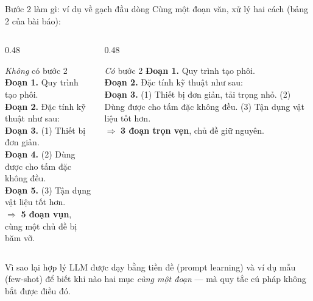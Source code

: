 \documentclass[aspectratio=169,10pt]{beamer}
\begin{document}
\begin{frame}{Bước 2 làm gì: ví dụ về gạch đầu dòng}
  {\small Cùng một đoạn văn, xử lý hai cách (bảng 2 của bài báo):}
  \vspace{0.3em}
  \begin{columns}[T]
    \begin{column}{0.48\textwidth}
      \begin{alertblock}{\small \emph{Không} có bước 2}
        \small
        \textbf{Đoạn 1.} Quy trình tạo phôi.\\
        \textbf{Đoạn 2.} Đặc tính kỹ thuật như sau:\\
        \textbf{Đoạn 3.} (1) Thiết bị đơn giản.\\
        \textbf{Đoạn 4.} (2) Dùng được cho tấm đặc không đều.\\
        \textbf{Đoạn 5.} (3) Tận dụng vật liệu tốt hơn.\\
        \vspace{0.2em}
        {\footnotesize $\Rightarrow$ \textbf{5 đoạn vụn}, cùng một chủ đề bị băm vỡ.}
      \end{alertblock}
    \end{column}
    \begin{column}{0.48\textwidth}
      \begin{block}{\small \emph{Có} bước 2}
        \small
        \textbf{Đoạn 1.} Quy trình tạo phôi.\\
        \textbf{Đoạn 2.} Đặc tính kỹ thuật như sau:\\
        \textbf{Đoạn 3.} (1) Thiết bị đơn giản, tải trọng nhỏ.
        (2) Dùng được cho tấm đặc không đều.
        (3) Tận dụng vật liệu tốt hơn.\\
        \vspace{0.2em}
        {\footnotesize $\Rightarrow$ \textbf{3 đoạn trọn vẹn}, chủ đề giữ nguyên.}
      \end{block}
    \end{column}
  \end{columns}
  \vspace{0.3em}
  \begin{alertblock}{\small Vì sao lại hợp lý}
    LLM được dạy bằng tiền đề (prompt learning) và ví dụ mẫu (few-shot) để biết
    khi nào hai mục \emph{cùng một đoạn} --- mà quy tắc cú pháp không bắt được điều đó.
  \end{alertblock}
\end{frame}
\end{document}
